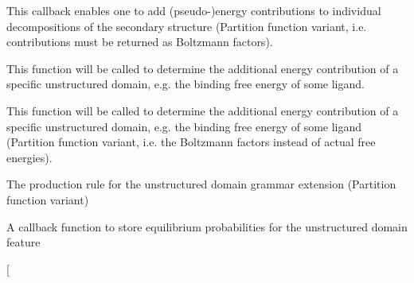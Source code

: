 \begin{DoxyRefList}
\item[\label{callbacks__callbacks000014}%
\Hypertarget{callbacks__callbacks000014}%
Global \hyperlink{group__soft__constraints_ga4099978d410513edeeff8f3db13144c5}{vrna\+\_\+callback\+\_\+sc\+\_\+exp\+\_\+energy} (int i, int j, int k, int l, unsigned char d, void $\ast$data)]This callback enables one to add (pseudo-\/)energy contributions to individual decompositions of the secondary structure (Partition function variant, i.\+e. contributions must be returned as Boltzmann factors).  
\item[\label{callbacks__callbacks000006}%
\Hypertarget{callbacks__callbacks000006}%
Global \hyperlink{group__domains__up_ga75825c57d0bfde4ae4f95c044260c5c3}{vrna\+\_\+callback\+\_\+ud\+\_\+energy} (vrna\+\_\+fold\+\_\+compound\+\_\+t $\ast$vc, int i, int j, unsigned int loop\+\_\+type, void $\ast$data)]This function will be called to determine the additional energy contribution of a specific unstructured domain, e.\+g. the binding free energy of some ligand.  
\item[\label{callbacks__callbacks000007}%
\Hypertarget{callbacks__callbacks000007}%
Global \hyperlink{group__domains__up_ga861706f257ba993753464b823e65b86e}{vrna\+\_\+callback\+\_\+ud\+\_\+exp\+\_\+energy} (vrna\+\_\+fold\+\_\+compound\+\_\+t $\ast$vc, int i, int j, unsigned int loop\+\_\+type, void $\ast$data)]This function will be called to determine the additional energy contribution of a specific unstructured domain, e.\+g. the binding free energy of some ligand (Partition function variant, i.\+e. the Boltzmann factors instead of actual free energies).  
\item[\label{callbacks__callbacks000009}%
\Hypertarget{callbacks__callbacks000009}%
Global \hyperlink{group__domains__up_ga33d78327dcd04c1ca5ab2887edc18c7b}{vrna\+\_\+callback\+\_\+ud\+\_\+exp\+\_\+production} (vrna\+\_\+fold\+\_\+compound\+\_\+t $\ast$vc, void $\ast$data)]The production rule for the unstructured domain grammar extension (Partition function variant)  
\item[\label{callbacks__callbacks000010}%
\Hypertarget{callbacks__callbacks000010}%
Global \hyperlink{group__domains__up_gab10498abc84fcaf336aca8f8d7d42eb2}{vrna\+\_\+callback\+\_\+ud\+\_\+probs\+\_\+add} (vrna\+\_\+fold\+\_\+compound\+\_\+t $\ast$vc, int i, int j, unsigned int loop\+\_\+type, F\+L\+T\+\_\+\+O\+R\+\_\+\+D\+BL exp\+\_\+energy, void $\ast$data)]A callback function to store equilibrium probabilities for the unstructured domain feature  
\item[\label{callbacks__callbacks000011}%

\end{DoxyRefList}
